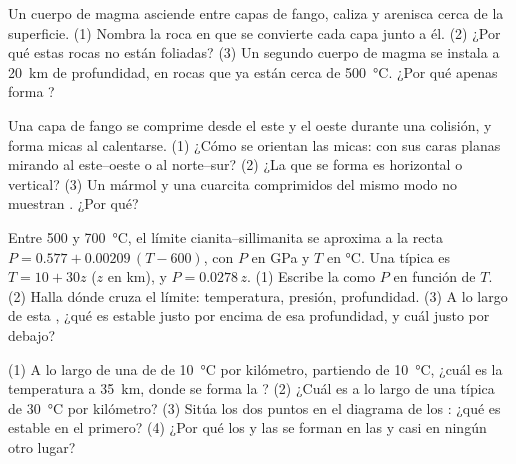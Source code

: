 \begin{exercise}[$\star\star$]\label{exo:g12:metamorphic-rocks:10}
Un cuerpo de magma asciende entre capas de fango, caliza y arenisca cerca de
la superficie. (1) Nombra la roca en que se convierte cada capa junto a él.
(2) ¿Por qué estas rocas no están foliadas? (3) Un segundo cuerpo de magma se
instala a \qty{20}{km} de profundidad, en rocas que ya están cerca de
\qty{500}{\celsius}. ¿Por qué apenas forma ?
\end{exercise}

\begin{exercise}[$\star\star$]\label{exo:g12:metamorphic-rocks:11}
Una capa de fango se comprime desde el este y el oeste durante una colisión,
y forma micas al calentarse. (1) ¿Cómo se orientan las micas: con sus caras
planas mirando al este--oeste o al norte--sur? (2) ¿La  que se forma
es horizontal o vertical? (3) Un mármol y una cuarcita comprimidos del mismo
modo no muestran . ¿Por qué?
\end{exercise}

\begin{exercise}[$\star\star\star$]\label{exo:g12:metamorphic-rocks:12}
Entre 500 y \qty{700}{\celsius}, el límite cianita--sillimanita se aproxima a
la recta $P = 0.577 + 0.00209\,(T - 600)$, con $P$ en
\unit{GPa} y $T$ en \unit{\celsius}. Una  típica es $T = 10 + 30z$
($z$ en \unit{km}), y $P = 0.0278\,z$. (1) Escribe la  como $P$ en
función de $T$. (2) Halla dónde cruza el límite: temperatura, presión,
profundidad. (3) A lo largo de esta , ¿qué  es estable justo
por encima de esa profundidad, y cuál justo por debajo?
\end{exercise}

\begin{exercise}[$\star\star\star$]\label{exo:g12:metamorphic-rocks:13}
(1) A lo largo de una  de  de \qty{10}{\celsius} por
kilómetro, partiendo de \qty{10}{\celsius}, ¿cuál es la temperatura a
\qty{35}{km}, donde se forma la ? (2) ¿Cuál es a lo largo de una
 típica de \qty{30}{\celsius} por kilómetro? (3) Sitúa los dos puntos
en el diagrama de los : ¿qué  es estable en el primero?
(4) ¿Por qué los  y las  se forman en las  y casi en ningún otro lugar?
\end{exercise}

